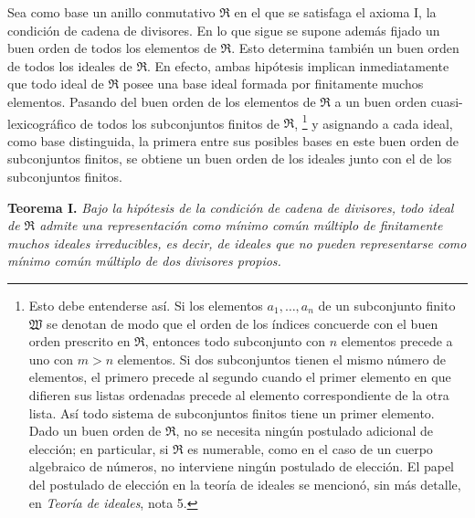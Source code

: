 \documentclass[11pt]{article}
\providecommand{\mR}{\mathfrak{R}}
\begin{document}
Sea como base un anillo conmutativo $\mR$ en el que se satisfaga el axioma I, la condición de cadena de divisores. En lo que sigue se supone además fijado un buen orden de todos los elementos de $\mR$. Esto determina también un buen orden de todos los ideales de $\mR$. En efecto, ambas hipótesis implican inmediatamente que todo ideal de $\mR$ posee una base ideal formada por finitamente muchos elementos. Pasando del buen orden de los elementos de $\mR$ a un buen orden cuasi-lexicográfico de todos los subconjuntos finitos de $\mR$,
\footnote{Esto debe entenderse así. Si los elementos $a_1,\ldots,a_n$ de un subconjunto finito $\mathfrak W$ se denotan de modo que el orden de los índices concuerde con el buen orden prescrito en $\mR$, entonces todo subconjunto con $n$ elementos precede a uno con $m>n$ elementos. Si dos subconjuntos tienen el mismo número de elementos, el primero precede al segundo cuando el primer elemento en que difieren sus listas ordenadas precede al elemento correspondiente de la otra lista. Así todo sistema de subconjuntos finitos tiene un primer elemento. Dado un buen orden de $\mR$, no se necesita ningún postulado adicional de elección; en particular, si $\mR$ es numerable, como en el caso de un cuerpo algebraico de números, no interviene ningún postulado de elección. El papel del postulado de elección en la teoría de ideales se mencionó, sin más detalle, en \emph{Teoría de ideales}, nota 5.}
y asignando a cada ideal, como base distinguida, la primera entre sus posibles bases en este buen orden de subconjuntos finitos, se obtiene un buen orden de los ideales junto con el de los subconjuntos finitos.

\textbf{Teorema I.} \emph{Bajo la hipótesis de la condición de cadena de divisores, todo ideal de $\mR$ admite una representación como mínimo común múltiplo de finitamente muchos ideales irreducibles, es decir, de ideales que no pueden representarse como mínimo común múltiplo de dos divisores propios.}
\end{document}
